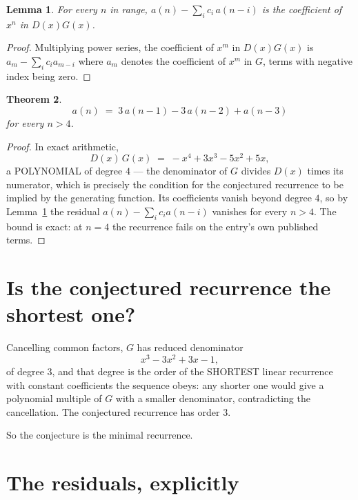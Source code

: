 \documentclass[11pt,a4paper]{article}
\theoremstyle{plain}
\newtheorem{theorem}{Theorem}
\newtheorem{lemma}[theorem]{Lemma}
\theoremstyle{definition}
\begin{document}
\begin{lemma}\label{lem:key}
For every $n$ in range, $a(n)-\sum_i c_i\,a(n-i)$ is the coefficient of $x^{n}$ in
$D(x)G(x)$.
\end{lemma}

\begin{proof}
Multiplying power series, the coefficient of $x^{m}$ in $D(x)G(x)$ is
$a_m-\sum_i c_i a_{m-i}$ where $a_m$ denotes the coefficient of $x^{m}$ in $G$, terms with
negative index being zero.
\end{proof}

\begin{theorem}
\[
a(n)\;=\;3\,a(n-1) - 3\,a(n-2) + a(n-3)
\]
for every $n>4$.
\end{theorem}

\begin{proof}
In exact arithmetic,
\[
D(x)\,G(x)\;=\;- x^{4} + 3 x^{3} - 5 x^{2} + 5 x,
\]
a POLYNOMIAL of degree $4$ --- the denominator of $G$ divides $D(x)$ times its numerator,
which is precisely the condition for the conjectured recurrence to be implied by the
generating function. Its coefficients vanish beyond degree $4$, so by
Lemma~\ref{lem:key} the residual $a(n)-\sum_ic_ia(n-i)$ vanishes for every
$n>4$. The bound is exact: at $n=4$ the recurrence fails on the entry's own published terms.
\end{proof}

\section{Is the conjectured recurrence the shortest one?}

Cancelling common factors, $G$ has reduced denominator
\[
x^{3} - 3 x^{2} + 3 x - 1,
\]
of degree $3$, and that degree is the order of the SHORTEST linear recurrence with
constant coefficients the sequence obeys: any shorter one would give a polynomial multiple of
$G$ with a smaller denominator, contradicting the cancellation. The conjectured recurrence has
order $3$.

So the conjecture is the minimal recurrence.

\section{The residuals, explicitly}
\end{document}
